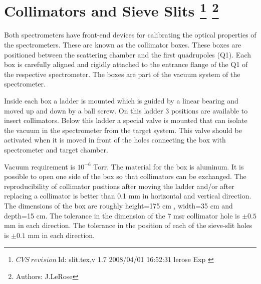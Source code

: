 \section[Collimators and Sieve Slits]{Collimators and Sieve Slits
\footnote{
  $CVS~revision~ $Id: slit.tex,v 1.7 2008/04/01 16:52:31 lerose Exp $ $ 
}
\footnote{Authors: J.LeRose }
}

Both spectrometers have front-end devices for calibrating the optical
properties of the spectrometers. These are known as the collimator boxes.
These boxes are positioned between the scattering chamber and the 
first quadrupoles (Q1). Each box is carefully aligned and rigidly attached
to the  entrance flange of the Q1 of the respective spectrometer.  The boxes are
part of the vacuum system of the spectrometer.

Inside each box a ladder is mounted which is guided by a linear bearing
and moved up and down by a ball screw. On this ladder 3 positions are 
available to insert collimators. Below this ladder
a special valve is mounted that can isolate the vacuum in the spectrometer
from the target system. This valve should be activated when it is moved
in front of the holes connecting the box with spectrometer and target chamber.

Vacuum requirement is $10^{-6}$ Torr. The material for the box is 
aluminum. It is possible to open one side of the box so that
collimators can be exchanged. The
reproducibility of collimator positions after moving
the ladder and/or after replacing a collimator is
better than 0.1 mm in horizontal and vertical direction.
The dimensions of the box are
roughly height=175 cm , width=35 cm and depth=15 cm.
The tolerance in the dimension
of the 7 msr collimator hole is $\pm0.5$ mm in each direction. 
The tolerance in the position
of each of the sieve-slit holes is $\pm0.1$ mm in each direction.

